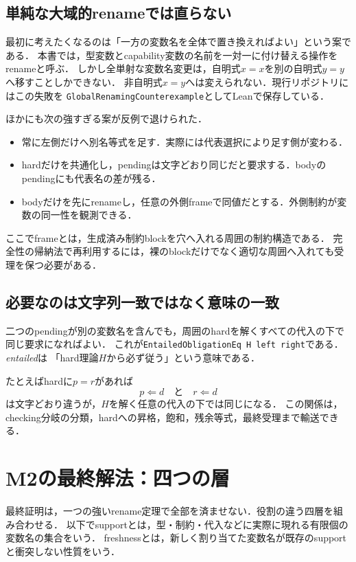 \documentclass[11pt,a4paper,oneside]{ltjsbook}
\newcommand{\code}[1]{\texttt{#1}}
\newcommand{\checks}{\mathrel{\Leftarrow}}
\begin{document}
\section{単純な大域的renameでは直らない}

最初に考えたくなるのは「一方の変数名を全体で置き換えればよい」という案である．
本書では，型変数とcapability変数の名前を一対一に付け替える操作をrenameと呼ぶ．
しかし全単射な変数名変更は，自明式$x=x$を別の自明式$y=y$へ移すことしかできない．
非自明式$x=y$へは変えられない．現行リポジトリにはこの失敗を
\code{GlobalRenamingCounterexample}としてLeanで保存している．

ほかにも次の強すぎる案が反例で退けられた．

\begin{itemize}[leftmargin=2em]
  \item 常に左側だけへ別名等式を足す．実際には代表選択により足す側が変わる．
  \item hardだけを共通化し，pendingは文字どおり同じだと要求する．bodyのpendingにも代表名の差が残る．
  \item bodyだけを先にrenameし，任意の外側frameで同値だとする．外側制約が変数の同一性を観測できる．
\end{itemize}

ここでframeとは，生成済み制約blockを穴へ入れる周囲の制約構造である．
完全性の帰納法で再利用するには，裸のblockだけでなく適切な周囲へ入れても受理を保つ必要がある．

\section{必要なのは文字列一致ではなく意味の一致}

二つのpendingが別の変数名を含んでも，周囲のhardを解くすべての代入の下で同じ要求になればよい．
これが\code{EntailedObligationEq H left right}である．\emph{entailed}は
「hard理論$H$から必ず従う」という意味である．

たとえばhardに$p=r$があれば
\[
  p\checks d
  \quad\text{と}\quad
  r\checks d
\]
は文字どおり違うが，$H$を解く任意の代入の下では同じになる．
この関係は，checking分岐の分類，hardへの昇格，飽和，残余等式，最終受理まで輸送できる．

\chapter{M2の最終解法：四つの層}

最終証明は，一つの強いrename定理で全部を済ませない．役割の違う四層を組み合わせる．
以下でsupportとは，型・制約・代入などに実際に現れる有限個の変数名の集合をいう．
freshnessとは，新しく割り当てた変数名が既存のsupportと衝突しない性質をいう．
\end{document}
